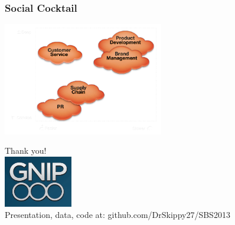 \documentclass{beamer}
\begin{document}

\begin{frame}\frametitle{Social Cocktail}
  \begin{center}
    \includegraphics[width=7cm]{./imgs/socialcocktailgrid.png}
  \end{center}
\end{frame}



\begin{frame}
  \begin{center}
  \Large{Thank you!  \\ [20pt]}
    \includegraphics[width=3cm]{./imgs/logo.png} \\ [15pt]
   \Large{Presentation, data, code at: github.com/DrSkippy27/SBS2013 }
  \end{center}
\end{frame}
\end{document}
